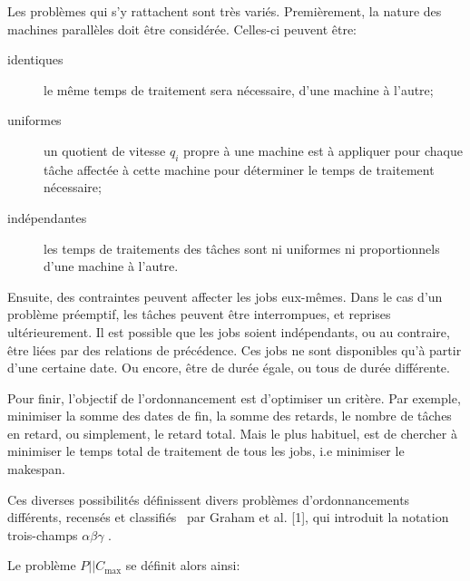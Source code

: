\documentclass[a4paper,12pt]{report}
\theoremstyle{plain}				%
\theoremstyle{definition}				%
\newcommand\problemGrahamP{$P||C_{\max}$\xspace}
\newcommand{\tdi}[1]{\todo[inline]{{#1}}{}}
\newcommand{\lp}[1]{\todo[author=LP,color=yellow,inline]{#1}}
\begin{document}
Les problèmes qui s'y rattachent sont très variés.
Premièrement, la nature des machines parallèles doit être considérée.
Celles-ci peuvent être:
\begin{description}
\item[identiques] le même temps de traitement sera nécessaire, d'une
  machine à l'autre;
\item[uniformes] un quotient de vitesse $q_i$ propre à une machine est à
  appliquer pour chaque tâche affectée à cette machine pour déterminer
  le temps de traitement nécessaire;
\item[indépendantes] les temps de traitements des tâches sont ni
  uniformes ni proportionnels d'une machine à l'autre.
\end{description}
Ensuite, des contraintes peuvent affecter les jobs eux-mêmes.
Dans le cas d'un problème préemptif, les tâches peuvent être
interrompues, et reprises ultérieurement.
Il est possible que les jobs soient indépendants, ou au contraire,
être liées par des relations de précédence.
Ces jobs ne sont disponibles qu'à partir d'une certaine date.
Ou encore, être de durée égale, ou tous de durée différente.

Pour finir, l'objectif de
l'ordonnancement est d'optimiser un
critère. Par exemple, minimiser la somme des dates de fin, la somme
des retards, le nombre de tâches en retard, ou simplement, le retard
total. Mais le plus habituel, est de chercher à minimiser le temps
total de traitement de tous les jobs, i.e minimiser le makespan.


Ces diverses possibilités définissent divers problèmes
d'ordonnancements différents, recensés et classifiés
\ par Graham et al. [1], qui introduit la notation trois-champs $\alpha
${\textbar}$\beta ${\textbar}$\gamma $ .

\bigskip

Le problème \problemGrahamP se définit alors ainsi:
\end{document}
